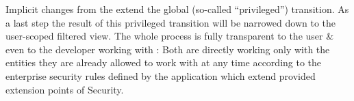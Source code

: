 Implicit changes from the  extend the global (so-called ``privileged'') transition. As a last step the result of this privileged transition will be narrowed down to the user-scoped filtered view. The whole process is fully transparent to the user \& even to the developer working with \AMBETH{}: Both are directly working only with the entities they are already allowed to work with at any time according to the enterprise security rules defined by the application which extend provided extension points of \AMBETH{} Security.
